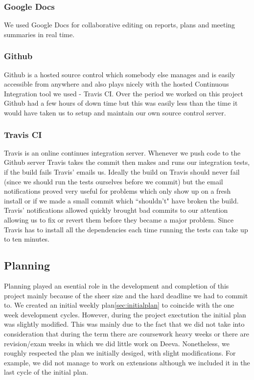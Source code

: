 \documentclass[11pt, a4paper]{article}
\begin{document}
\subsubsection{Google Docs}
We used Google Docs for collaborative editing on reports, plans and meeting summaries in real time.

\subsubsection{Github}
Github is a hosted source control which somebody else manages and is easily accessible from anywhere and also plays nicely with the hosted Continuous Integration tool we used - Travis CI.
Over the period we worked on this project Github had a few hours of down time but this was easily less than the time it would have taken us to setup and maintain our own source control server.

\subsubsection{Travis CI}
Travis\cite{TravisCI} is an online continues integration server.
Whenever we push code to the Github server Travis takes the commit then makes and runs our integration tests, if the build fails Travis' emails us.
Ideally the build on Travis should never fail (since we should run the tests ourselves before we commit) but the email notifications proved very useful for problems which only show up on a fresh install or if we made a small commit which ``shouldn't" have broken the build.
Travis' notifications allowed quickly brought bad commits to our attention allowing us to fix or revert them before they became a major problem.
Since Travis has to install all the dependencies each time running the tests can take up to ten minutes.

\subsection{Planning}
Planning played an esential role in the development and completion of this project mainly because of the sheer size and the hard deadline we had to commit to.
We created an initial weekly plan\ref{sec:initialplan} to coincide with the one week development cycles.
However, during the project exectution the initial plan was slightly modified.
This was mainly due to the fact that we did not take into consideration that during the term there are coursework heavy weeks or there are revision/exam weeks in which we did little work on Deeva.
Nonetheless, we roughly respected the plan we initially desiged, with slight modifications.
For example, we did not manage to work on extensions although we included it in the last cycle of the initial plan.
\end{document}
